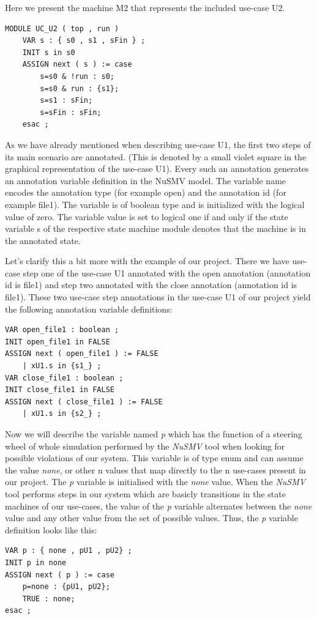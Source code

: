 Here we present the machine M2 that represents the included use-case U2.
\begin{lstlisting}
MODULE UC_U2 ( top , run )
	VAR s : { s0 , s1 , sFin } ;
	INIT s in s0
	ASSIGN next ( s ) := case
		s=s0 & !run : s0;
		s=s0 & run : {s1};
		s=s1 : sFin;
		s=sFin : sFin;
	esac ;
\end{lstlisting}

As we have already mentioned when describing use-case U1, the first two steps of its main scenario are annotated. (This is denoted
by a small violet square in the graphical representation of the use-case U1). Every such an annotation generates an annotation variable
definition in the NuSMV model. The variable name encodes the annotation type (for example open) and the annotation id (for example
file1). The variable is of boolean type and is initialized with the logical value of zero. The variable value is set to logical one
if and only if the state variable s of the respective state machine module denotes that the machine is in the annotated state.

Let's clarify this a bit more with the example of our project. There we have use-case step one of the use-case U1 annotated with the
open annotation (annotation id is file1) and step two annotated with the close annotation (annotation id is file1). These two use-case
step annotations in the use-case U1 of our project yield the following annotation variable definitions:

\begin{lstlisting}
VAR open_file1 : boolean ;
INIT open_file1 in FALSE
ASSIGN next ( open_file1 ) := FALSE
	| xU1.s in {s1_} ;
VAR close_file1 : boolean ;
INIT close_file1 in FALSE
ASSIGN next ( close_file1 ) := FALSE
	| xU1.s in {s2_} ;
\end{lstlisting}

Now we will describe the variable named \emph{p} which has the function of a steering wheel of whole simulation performed by the \emph{NuSMV} tool
when looking for possible violations of our system. This variable is of type enum and can assume the value \emph{none}, or other n values that
map directly to the n use-cases present in our project. The \emph{p} variable is initialised with the \emph{none} value. When the \emph{NuSMV} tool performs
steps in our system which are basicly transitions in the state machines of our use-cases, the value of the \emph{p} variable alternates between
the \emph{none} value and any other value from the set of possible values. Thus, the \emph{p} variable definition looks like this:
\begin{lstlisting}
VAR p : { none , pU1 , pU2} ;
INIT p in none
ASSIGN next ( p ) := case
	p=none : {pU1, pU2};
	TRUE : none;
esac ;
\end{lstlisting}

